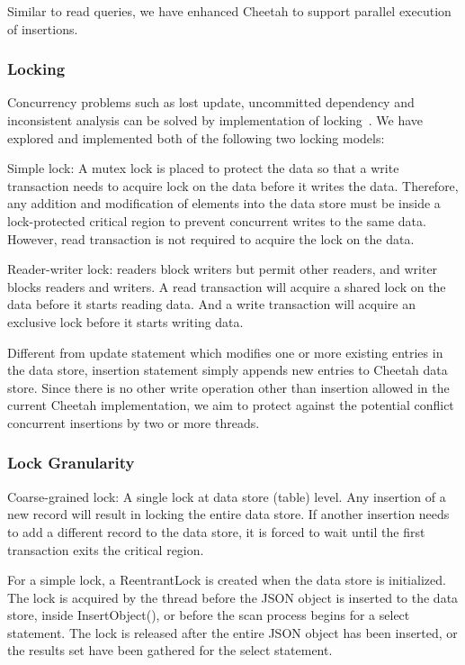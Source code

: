 \documentclass[11pt,journal,compsoc]{IEEEtran}
\begin{document}
Similar to read queries, we have enhanced Cheetah to support parallel execution of insertions.



\subsubsection{Locking}
Concurrency problems such as lost update, uncommitted dependency and inconsistent analysis can be solved by implementation of locking~\cite{krueger2010data}\cite{garcia1992main}. We have explored and implemented both of the following two locking models:
 
Simple lock: A mutex lock is placed to protect the data so that a write transaction needs to acquire lock on the data before it writes the data. Therefore, any addition and modification of elements into the data store must be inside a lock-protected critical region to prevent concurrent writes to the same data. However, read transaction is not required to acquire the lock on the data.
 
Reader-writer lock: readers block writers but permit other readers, and writer blocks readers and writers. A read transaction will acquire a shared lock on the data before it starts reading data. And a write transaction will acquire an exclusive lock before it starts writing data.
 
Different from update statement which modifies one or more existing entries in the data store, insertion statement simply appends new entries to Cheetah data store. Since there is no other write operation other than insertion allowed in the current Cheetah implementation, we aim to protect against the potential conflict concurrent insertions by two or more threads.

\subsubsection{Lock Granularity}
Coarse-grained lock: A single lock at data store (table) level. Any insertion of a new record will result in locking the entire data store. If another insertion needs to add a different record to the data store, it is forced to wait until the first transaction exits the critical region.
 
For a simple lock, a ReentrantLock is created when the data store is initialized. The lock is acquired by the thread before the JSON object is inserted to the data store, inside InsertObject(), or before the scan process begins for a select statement.  The lock is released after the entire JSON object has been inserted, or the results set have been gathered for the select statement.
\end{document}
